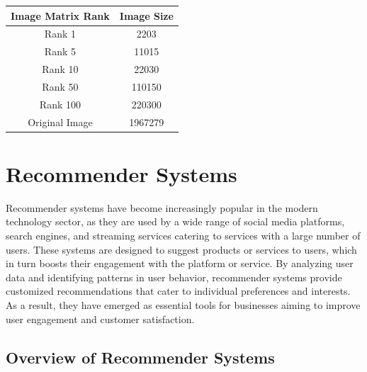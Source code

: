 \documentclass[12pt]{article}
\begin{document}
\begin{center}
\begin{tabular}{|c|c|}
\hline
Image Matrix Rank & Image Size \\
\hline
Rank 1 & 2203\\
\hline
Rank 5 & 11015\\
\hline
Rank 10 & 22030\\
\hline
Rank 50 & 110150\\
\hline
Rank 100 & 220300\\
\hline
Original Image & 1967279\\
\hline
\end{tabular}
    
\end{center}
\section{Recommender Systems}

Recommender systems have become increasingly popular in the modern technology sector, as they are used by a wide range of social media platforms, search engines, and streaming services catering to services with a large number of users. These systems are designed to suggest products or services to users, which in turn boosts their engagement with the platform or service. By analyzing user data and identifying patterns in user behavior, recommender systems provide customized recommendations that cater to individual preferences and interests. As a result, they have emerged as essential tools for businesses aiming to improve user engagement and customer satisfaction.

\subsection{Overview of Recommender Systems}
\end{document}
